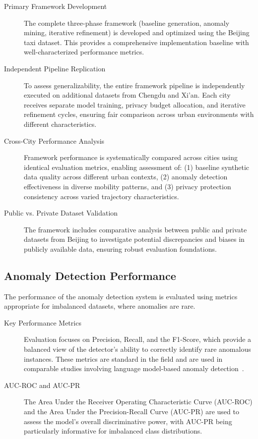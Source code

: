 \documentclass[runningheads]{llncs}
\begin{document}
\begin{description}
    \item[Primary Framework Development] The complete three-phase framework (baseline generation, anomaly mining, iterative refinement) is developed and optimized using the Beijing taxi dataset. This provides a comprehensive implementation baseline with well-characterized performance metrics.
    \item[Independent Pipeline Replication] To assess generalizability, the entire framework pipeline is independently executed on additional datasets from Chengdu and Xi'an. Each city receives separate model training, privacy budget allocation, and iterative refinement cycles, ensuring fair comparison across urban environments with different characteristics.
    \item[Cross-City Performance Analysis] Framework performance is systematically compared across cities using identical evaluation metrics, enabling assessment of: (1) baseline synthetic data quality across different urban contexts, (2) anomaly detection effectiveness in diverse mobility patterns, and (3) privacy protection consistency across varied trajectory characteristics.
    \item[Public vs. Private Dataset Validation] The framework includes comparative analysis between public and private datasets from Beijing to investigate potential discrepancies and biases in publicly available data, ensuring robust evaluation foundations.
\end{description}

\subsection{Anomaly Detection Performance}
\label{sec:results}

The performance of the anomaly detection system is evaluated using metrics appropriate for imbalanced datasets, where anomalies are rare.

\begin{description}
    \item[Key Performance Metrics] Evaluation focuses on Precision, Recall, and the F1-Score, which provide a balanced view of the detector's ability to correctly identify rare anomalous instances. These metrics are standard in the field and are used in comparable studies involving language model-based anomaly detection~\cite{mbuyaTrajectoryAnomalyDetection2024}.
    \item[AUC-ROC and AUC-PR] The Area Under the Receiver Operating Characteristic Curve (AUC-ROC) and the Area Under the Precision-Recall Curve (AUC-PR) are used to assess the model's overall discriminative power, with AUC-PR being particularly informative for imbalanced class distributions.
\end{description}
\end{document}
